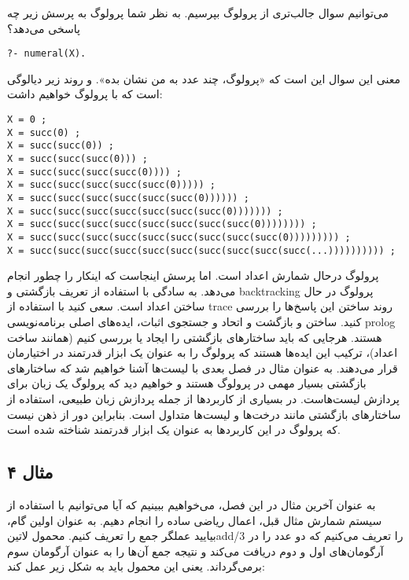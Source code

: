 می‌توانیم سوال جالب‌تری از پرولوگ بپرسیم. به نظر شما پرولوگ به پرسش زیر چه پاسخی می‌دهد؟

\begin{latin}
\begin{lstlisting}
?- numeral(X).
\end{lstlisting}
\end{latin}

معنی این سوال این است که «پرولوگ، چند عدد به من نشان بده». و روند زیر دیالوگی است که با پرولوگ خواهیم داشت:

\begin{latin}
\begin{lstlisting}
X = 0 ;
X = succ(0) ;
X = succ(succ(0)) ;
X = succ(succ(succ(0))) ;
X = succ(succ(succ(succ(0)))) ;
X = succ(succ(succ(succ(succ(0))))) ;
X = succ(succ(succ(succ(succ(succ(0)))))) ;
X = succ(succ(succ(succ(succ(succ(succ(0))))))) ;
X = succ(succ(succ(succ(succ(succ(succ(succ(0)))))))) ;
X = succ(succ(succ(succ(succ(succ(succ(succ(succ(0))))))))) ;
X = succ(succ(succ(succ(succ(succ(succ(succ(succ(succ(...)))))))))) ;
\end{lstlisting}
\end{latin}

پرولوگ درحال شمارش اعداد است. اما پرسش اینجاست که اینکار را چطور انجام می‌دهد. به سادگی با استفاده از تعریف بازگشتی و backtracking پرولوگ در حال ساختن اعداد است. سعی کنید با استفاده از trace روند ساختن این پاسخ‌ها را بررسی کنید. ساختن و بازگشت و اتحاد و جستجوی اثبات، ایده‌های اصلی برنامه‌نویسی prolog هستند. هرجایی که باید ساختارهای بازگشتی را ایجاد یا بررسی کنیم (همانند ساخت اعداد)، ترکیب این ایده‌ها هستند که پرولوگ را به عنوان یک ابزار قدرتمند در اختیارمان قرار می‌دهند. به عنوان مثال در فصل بعدی با لیست‌ها آشنا خواهیم شد که ساختارهای بازگشتی بسیار مهمی در پرولوگ هستند و خواهیم دید که پرولوگ یک زبان برای پردازش لیست‌هاست. در بسیاری از کاربردها از جمله پردازش زبان طبیعی، استفاده از ساختارهای بازگشتی مانند درخت‌ها و لیست‌ها متداول است. بنابراین دور از ذهن نیست که پرولوگ در این کاربردها به عنوان یک ابزار قدرتمند شناخته شده است.

\subsection{مثال ۴}
به عنوان آخرین مثال در این فصل، می‌خواهیم ببینیم که آیا می‌توانیم با استفاده از سیستم شمارش مثال قبل، اعمال ریاضی ساده را انجام دهیم. به عنوان اولین گام، بیایید عملگر جمع را تعریف کنیم. محمول ‌لاتین{add/3} را تعریف می‌کنیم که دو عدد را در آرگومان‌های اول و دوم دریافت می‌کند و نتیجه جمع آن‌ها را به عنوان آرگومان سوم برمی‌گرداند. یعنی این محمول باید به شکل زیر عمل کند:

